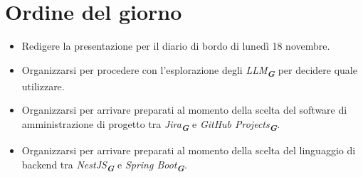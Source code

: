 

\section{Ordine del giorno}

\begin{itemize}
    \item Redigere la presentazione per il diario di bordo di lunedì 18 novembre.
    \item Organizzarsi per procedere con l'esplorazione degli \emph{LLM}\textsubscript{\textit{\textbf{G}}} per decidere quale utilizzare.
    \item Organizzarsi per arrivare preparati al momento della scelta del software di amministrazione di progetto tra 
    \emph{Jira}\textsubscript{\textit{\textbf{G}}} e \emph{GitHub Projects}\textsubscript{\textit{\textbf{G}}}.
    \item Organizzarsi per arrivare preparati al momento della scelta del linguaggio di backend tra \emph{NestJS}\textsubscript{\textit{\textbf{G}}} e 
    \emph{Spring Boot}\textsubscript{\textit{\textbf{G}}}.
\end{itemize}